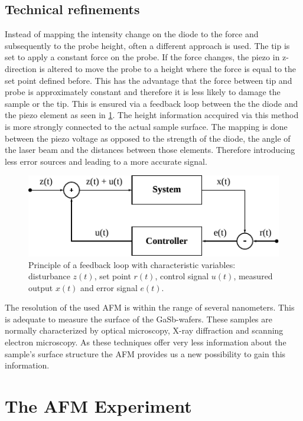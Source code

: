 \documentclass[paper=a4,fontsize=10pt,DIV=18,twocolumn,parskip=half]{scrartcl}
\numberwithin{equation}{section}    %
\begin{document}
\subsection{Technical refinements}
Instead of mapping the intensity change on the diode to the force and 
subsequently to the probe height, often a different approach is used. The tip is 
set to apply a constant force on the probe. If the force changes, the piezo in 
z-direction is altered to move the probe to a height where the force is equal to 
the set point defined before. This has the advantage that the force between tip 
and probe is approximately constant and therefore it is less likely to damage 
the sample or the tip. This is ensured via a feedback loop between the the diode 
and the piezo element as seen in \cref{control_loop}. The height information 
accquired via this method is more strongly connected to the actual sample 
surface. The mapping is done between the piezo voltage as opposed to the 
strength of the diode, the angle of the laser beam and the distances between 
those elements. Therefore introducing less error sources and leading to a more 
accurate signal.

\begin{figure}
    \centering
    \includegraphics{Bilder/control_loop.pdf}
    \caption{Principle of a feedback loop with characteristic variables: 
    disturbance $z(t)$, set point $r(t)$, control signal $u(t)$, measured output 
    $x(t)$ and error signal $e(t)$.}
    \label{control_loop}
\end{figure}

The resolution of the used AFM is within the range of several nanometers.  This 
is adequate to measure the surface of the GaSb-wafers. These samples are 
normally characterized by optical microscopy, X-ray diffraction and scanning 
electron microscopy. As these techniques offer very less information about the 
sample's surface structure the AFM provides us a new possibility to gain this 
information.

\section{The AFM Experiment}
\label{Experiment}
\end{document}
